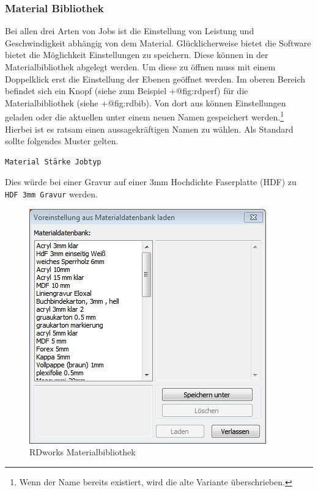 \documentclass[]{article}
\begin{document}
\hypertarget{material-bibliothek}{%
\subsubsection{Material Bibliothek}\label{material-bibliothek}}

Bei allen drei Arten von Jobs ist die Einstellung von Leistung und
Geschwindigkeit abhängig von dem Material. Glücklicherweise bietet die
Software bietet die Möglichkeit Einstellungen zu speichern. Diese können
in der Materialbibliothek abgelegt werden. Um diese zu öffnen muss mit
einem Doppelklick erst die Einstellung der Ebenen geöffnet werden. Im
oberen Bereich befindet sich ein Knopf (siehe zum Beispiel +@fig:rdperf)
für die Materialbibliothek (siehe +@fig:rdbib). Von dort aus können
Einstellungen geladen oder die aktuellen unter einem neuen Namen
gespeichert werden.\footnote{Wenn der Name bereits existiert, wird die
  alte Variante überschrieben.} Hierbei ist es ratsam einen
aussagekräftigen Namen zu wählen. Als Standard sollte folgendes Muster
gelten.

\begin{verbatim}
Material Stärke Jobtyp
\end{verbatim}

Dies würde bei einer Gravur auf einer 3mm Hochdichte Faserplatte (HDF)
zu \texttt{HDF\ 3mm\ Gravur} werden.

\begin{figure}
\hypertarget{fig:rdbib}{%
\centering
\includegraphics{assets/images/rdworks-materialbib.PNG}
\caption{RDworks Materialbibliothek}\label{fig:rdbib}
}
\end{figure}
\end{document}
